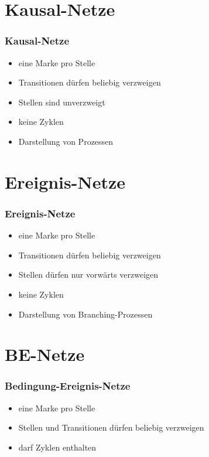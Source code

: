 \section{Kausal-Netze}

\begin{frame}
	\frametitle{Kausal-Netze}
	
	\begin{itemize}
		\item eine Marke pro Stelle
		\item Transitionen dürfen beliebig verzweigen
		\item Stellen sind unverzweigt
		\item keine Zyklen
		\item Darstellung von Prozessen
	\end{itemize}
	
\end{frame}

\section{Ereignis-Netze}

\begin{frame}
	\frametitle{Ereignis-Netze}
	
	\begin{itemize}
		\item eine Marke pro Stelle
		\item Transitionen dürfen beliebig verzweigen
		\item Stellen dürfen nur vorwärts verzweigen
		\item keine Zyklen
		\item Darstellung von Branching-Prozessen
	\end{itemize}
	
\end{frame}

\section{BE-Netze}

\begin{frame}
	\frametitle{Bedingung-Ereignis-Netze}
	
	\begin{itemize}
		\item eine Marke pro Stelle
		\item Stellen und Transitionen dürfen beliebig verzweigen
		\item darf Zyklen enthalten
	\end{itemize}
	
\end{frame}



